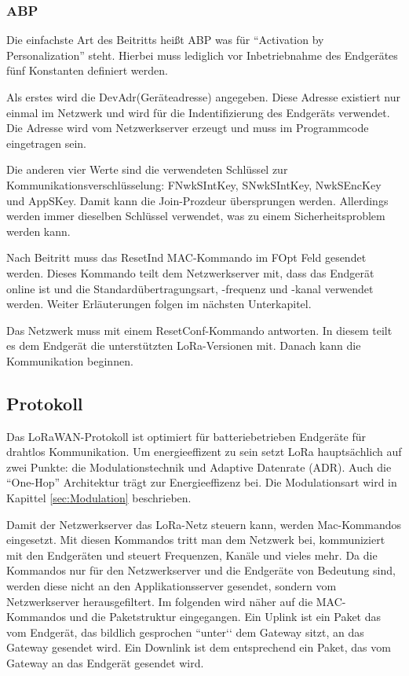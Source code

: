\documentclass[a4paper, 12pt]{article}
\begin{document}
            \subsubsection{ABP}
                Die einfachste Art des Beitritts heißt ABP was für ``Activation by Personalization'' steht. 
                Hierbei muss lediglich vor Inbetriebnahme des 
                Endgerätes fünf Konstanten definiert werden. 

                Als erstes wird die DevAdr(Geräteadresse) angegeben. Diese Adresse existiert nur einmal im 
                Netzwerk und wird für die Indentifizierung des Endgeräts verwendet. Die Adresse wird vom Netzwerkserver 
                erzeugt und muss im Programmcode eingetragen sein.

                Die anderen vier Werte sind die verwendeten Schlüssel zur Kommunikationsverschlüsselung:  
                FNwkSIntKey, SNwkSIntKey, NwkSEncKey und AppSKey. Damit kann die Join-Prozdeur 
                übersprungen werden. Allerdings werden immer dieselben Schlüssel verwendet, was zu einem 
                Sicherheitsproblem werden kann.

                Nach Beitritt muss das ResetInd MAC-Kommando im FOpt Feld gesendet werden. Dieses Kommando 
                teilt dem Netzwerkserver mit, dass das Endgerät online ist und die Standardübertragungsart, 
                -frequenz und -kanal verwendet werden. Weiter Erläuterungen folgen im nächsten Unterkapitel.

                Das Netzwerk muss  mit einem ResetConf-Kommando antworten. In diesem teilt es dem Endgerät die
                unterstützten LoRa-Versionen mit. Danach kann die Kommunikation beginnen.
        \subsection{Protokoll} \label{sec:protokoll}
            Das LoRaWAN-Protokoll ist optimiert für batteriebetrieben Endgeräte für drahtlos Kommunikation. 
            Um energieeffizent zu sein setzt LoRa hauptsächlich auf zwei Punkte: die Modulationstechnik und  
            Adaptive Datenrate (ADR). Auch die 
            ``One-Hop'' Architektur trägt zur Energieeffizenz bei. Die Modulationsart wird in Kapittel 
            \ref{sec:Modulation}  beschrieben. \cite[S,1 f]{LoRaClasses}


            Damit der Netzwerkserver das LoRa-Netz steuern kann, werden Mac-Kommandos eingesetzt. Mit diesen 
            Kommandos tritt man dem Netzwerk bei, kommuniziert mit den Endgeräten und steuert
            Frequenzen, Kanäle und vieles mehr.
            Da die Kommandos nur für den Netzwerkserver und die Endgeräte von Bedeutung sind, werden diese nicht an 
            den Applikationsserver gesendet, sondern vom Netzwerkserver herausgefiltert. Im folgenden wird näher auf 
            die MAC-Kommandos und die Paketstruktur eingegangen.
            Ein Uplink ist ein Paket das vom Endgerät, das bildlich gesprochen ``unter‘‘ dem Gateway sitzt, an das 
            Gateway gesendet wird. Ein Downlink ist dem entsprechend ein Paket, das vom Gateway an das Endgerät gesendet 
            wird.
\end{document}
